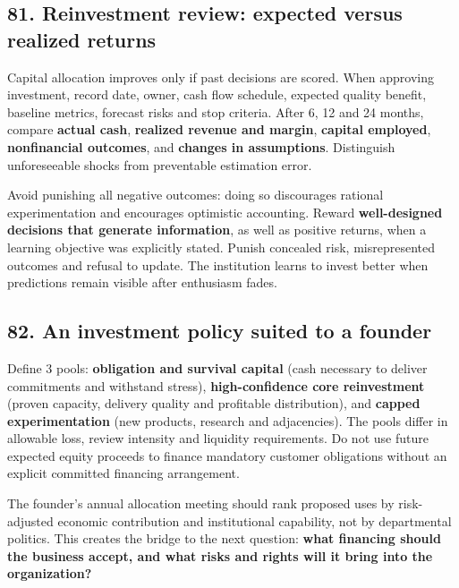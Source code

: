 \subsection{81. Reinvestment review: expected versus realized returns}


Capital allocation improves only if past decisions are scored. When approving investment, record date, owner, cash flow schedule, expected quality benefit, baseline metrics, forecast risks and stop criteria. After 6, 12 and 24 months, compare \textbf{actual cash}, \textbf{realized revenue and margin}, \textbf{capital employed}, \textbf{nonfinancial outcomes}, and \textbf{changes in assumptions}. Distinguish unforeseeable shocks from preventable estimation error.

Avoid punishing all negative outcomes: doing so discourages rational experimentation and encourages optimistic accounting. Reward \textbf{well-designed decisions that generate information}, as well as positive returns, when a learning objective was explicitly stated. Punish concealed risk, misrepresented outcomes and refusal to update. The institution learns to invest better when predictions remain visible after enthusiasm fades.

\subsection{82. An investment policy suited to a founder}


Define 3 pools: \textbf{obligation and survival capital} (cash necessary to deliver commitments and withstand stress), \textbf{high-confidence core reinvestment} (proven capacity, delivery quality and profitable distribution), and \textbf{capped experimentation} (new products, research and adjacencies). The pools differ in allowable loss, review intensity and liquidity requirements. Do not use future expected equity proceeds to finance mandatory customer obligations without an explicit committed financing arrangement.

The founder's annual allocation meeting should rank proposed uses by risk-adjusted economic contribution and institutional capability, not by departmental politics. This creates the bridge to the next question: \textbf{what financing should the business accept, and what risks and rights will it bring into the organization?}

